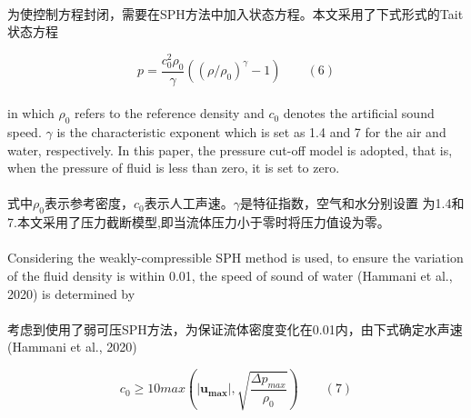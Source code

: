 \documentclass[UTF8]{ctexart}
\begin{document}
{{\paragraph{\quad}为使控制方程封闭，需要在SPH方法中加入状态方程。本文采用了下式形式的Tait状态方程

\begin{equation}
   p=\frac{c_0^2 \rho_0}{\gamma}((\rho / \rho_0)^\gamma-1) \qquad (6)
\end{equation}

\paragraph{\quad}in which $\rho_0$ refers to the reference density and $c_0$ denotes the 
                artificial sound speed. $\gamma$ is the characteristic exponent which is 
                set as 1.4 and 7 for the air and water, respectively. In this paper, 
                the pressure cut-off model is adopted, that is, when the pressure of 
                fluid is less than zero, it is set to zero.
\paragraph{\quad}式中$\rho_0$表示参考密度，$c_0$表示人工声速。$\gamma$是特征指数，空气和水分别设置
                为1.4和7.本文采用了压力截断模型,即当流体压力小于零时将压力值设为零。

\paragraph{\quad}Considering the weakly-compressible SPH method is used, 
                to ensure the variation of the fluid density is within 0.01, 
                the speed of sound of water (Hammani et al., 2020) is determined by
\paragraph{\quad}考虑到使用了弱可压SPH方法，为保证流体密度变化在0.01内，由下式确定水声速(Hammani et al., 2020)

\begin{equation}
   c_0 \ge 10 max(|\mathbf{u_{max}}|,\sqrt{\frac{\Delta p_{max}}{\rho_0}}) \qquad (7)
\end{equation}

}}
\end{document}

